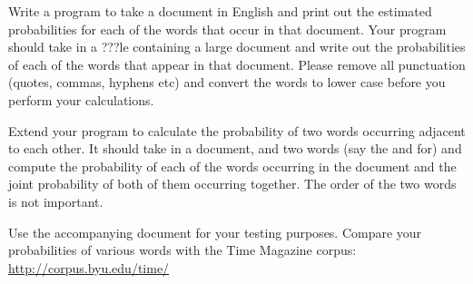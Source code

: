 \documentclass[]{article}
\begin{document}
Write a program to take a document in English and print out the
estimated probabilities for each of the words that occur in that
document. Your program should take in a ???le containing a large
document and write out the probabilities of each of the words that
appear in that document. Please remove all punctuation (quotes, commas,
hyphens etc) and convert the words to lower case before you perform your
calculations.

Extend your program to calculate the probability of two words occurring
adjacent to each other. It should take in a document, and two words (say
the and for) and compute the probability of each of the words occurring
in the document and the joint probability of both of them occurring
together. The order of the two words is not important.

Use the accompanying document for your testing purposes. Compare your
probabilities of various words with the Time Magazine corpus:
\url{http://corpus.byu.edu/time/}
\end{document}
